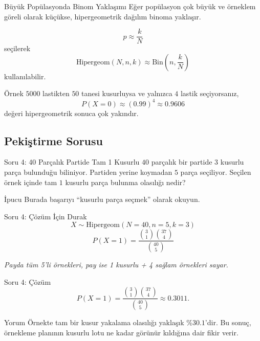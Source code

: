 \documentclass[light]{lutbeamer}
\begin{document}
\begin{frame}{Büyük Popülasyonda Binom Yaklaşımı}
    \small
    Eğer popülasyon çok büyük ve örneklem göreli olarak küçükse, hipergeometrik dağılım binoma yaklaşır.

    \[
    p \approx \frac{k}{N}
    \]
    seçilerek
    \[
    \text{Hipergeom}(N,n,k) \approx \mathrm{Bin}\left(n,\frac{k}{N}\right)
    \]
    kullanılabilir.

    \begin{exampleblock}{Örnek}
        \(5000\) lastikten \(50\) tanesi kusurluysa ve yalnızca \(4\) lastik seçiyorsanız,
        \[
        P(X=0)\approx (0.99)^4 \approx 0.9606
        \]
        değeri hipergeometrik sonuca çok yakındır.
    \end{exampleblock}
\end{frame}

\subsection{Pekiştirme Sorusu}

\begin{frame}{Soru 4: 40 Parçalık Partide Tam 1 Kusurlu}
    \small
    \(40\) parçalık bir partide \(3\) kusurlu parça bulunduğu biliniyor. Partiden yerine koymadan \(5\) parça seçiliyor. Seçilen örnek içinde tam \(1\) kusurlu parça bulunma olasılığı nedir?

    \begin{block}{İpucu}
        Burada başarıyı ``kusurlu parça seçmek'' olarak okuyun.
    \end{block}
\end{frame}

\begin{frame}{Soru 4: Çözüm İçin Durak}
    \color{red!70!black}
    \small
    \[
    X \sim \text{Hipergeom}(N=40,n=5,k=3)
    \]
    \[
    P(X=1)=\frac{\binom{3}{1}\binom{37}{4}}{\binom{40}{5}}
    \]

    \begin{center}
        \textit{Payda tüm 5'li örnekleri, pay ise 1 kusurlu + 4 sağlam örnekleri sayar.}
    \end{center}
\end{frame}

\begin{frame}{Soru 4: Çözüm}
    \small
    \[
    P(X=1)=\frac{\binom{3}{1}\binom{37}{4}}{\binom{40}{5}}\approx 0.3011.
    \]

    \begin{exampleblock}{Yorum}
        Örnekte tam bir kusur yakalama olasılığı yaklaşık \(\%30.1\)'dir. Bu sonuç, örnekleme planının kusurlu lotu ne kadar görünür kıldığına dair fikir verir.
    \end{exampleblock}
\end{frame}
\end{document}
